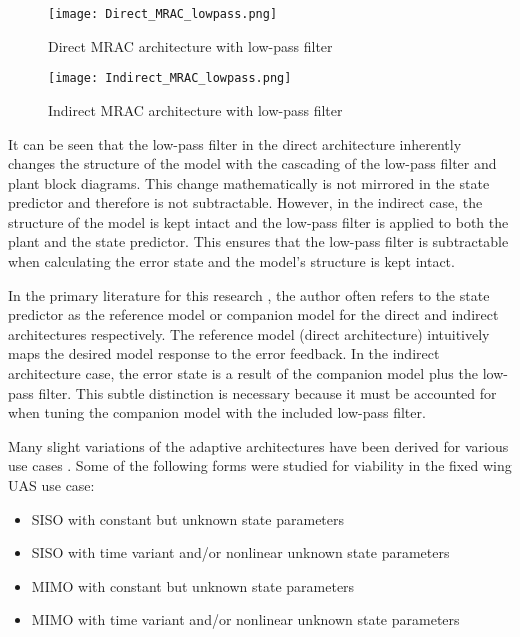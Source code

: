 \begin{figure}[h!]
 \centering
  \texttt{[image: Direct\_MRAC\_lowpass.png]}
  \caption{Direct \ac{MRAC} architecture with low-pass filter }
  \label{fig:direct_mrac_lowpass}
\end{figure}

\begin{figure}[h!]
 \centering
  \texttt{[image: Indirect\_MRAC\_lowpass.png]}
  \caption{Indirect \ac{MRAC} architecture with low-pass filter }
  \label{fig:indirect_mrac_lowpass}
\end{figure}

 It can be seen that the low-pass filter in the direct architecture inherently changes the structure of the model with the cascading of the low-pass filter and plant block diagrams.  This change mathematically is not mirrored in the state predictor and therefore is not subtractable.  However, in the indirect case, the structure of the model is kept intact and the low-pass filter is applied to both the plant and the state predictor.  This ensures that the low-pass filter is subtractable when calculating the error state and the model's structure is kept intact.

In the primary literature for this research \cite{hovakimyan2010l1}, the author often refers to the state predictor as the reference model or companion model for the direct and indirect architectures respectively.  The reference model (direct architecture) intuitively maps the desired model response to the error feedback.  In the indirect architecture case, the error state is a result of the companion model plus the low-pass filter.  This subtle distinction is necessary because it must be accounted for when tuning the companion model with the included low-pass filter.

Many slight variations of the \Lone adaptive architectures have been derived for various use cases \cite{hovakimyan2010l1}.  Some of the following forms were studied for viability in the fixed wing \ac{UAS} use case:
\begin{itemize}
	\item \ac{SISO} with constant but unknown state parameters
	\item \ac{SISO} with time variant and/or nonlinear unknown state parameters
	\item \ac{MIMO} with constant but unknown state parameters
	\item \ac{MIMO} with time variant and/or nonlinear unknown state parameters
\end{itemize}


